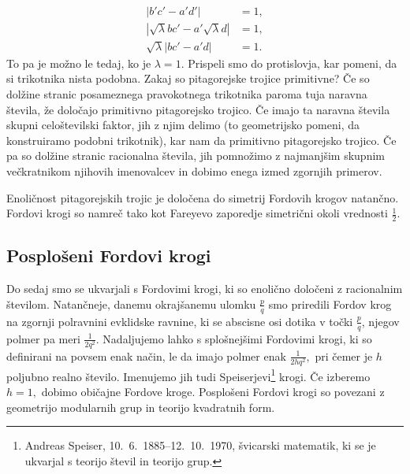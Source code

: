\documentclass[mat1]{fmfdelo}
\begin{document}
\begin{dokaz}
%
\begin{align}
|b'c'-a'd'| &= 1, \nonumber \\
|\sqrt\lambda bc' - a' \sqrt\lambda d| &= 1, \nonumber \\
\sqrt\lambda |bc'-a'd| &= 1.
\end{align}
%
To pa je možno le tedaj, ko je $\lambda=1.$ Prispeli smo do protislovja, kar pomeni, da si trikotnika nista podobna.
%
Zakaj so pitagorejske trojice primitivne?
Če so dolžine stranic posameznega pravokotnega trikotnika paroma tuja naravna števila, že določajo primitivno pitagorejsko trojico.
Če imajo ta naravna števila skupni celoštevilski faktor, jih z njim delimo (to geometrijsko pomeni, da konstruiramo podobni trikotnik), kar nam da primitivno pitagorejsko trojico.
Če pa so dolžine stranic racionalna števila, jih pomnožimo z najmanjšim skupnim večkratnikom njihovih imenovalcev in dobimo enega izmed zgornjih primerov.
\end{dokaz}

\begin{opomba}
Enoličnost pitagorejskih trojic je določena do simetrij Fordovih krogov natančno. Fordovi krogi so namreč tako kot Fareyevo zaporedje simetrični okoli vrednosti $\frac{1}{2}$.
\end{opomba}

\subsection{Posplošeni Fordovi krogi}

Do sedaj smo se ukvarjali s Fordovimi krogi, ki so enolično določeni z racionalnim številom. Natančneje, danemu okrajšanemu ulomku $\frac{p}{q}$ smo priredili Fordov krog na zgornji polravnini evklidske ravnine, ki se abscisne osi dotika v točki $\frac{p}{q}$, njegov polmer pa meri $\frac{1}{2q^2}.$
Nadaljujemo lahko s splošnejšimi Fordovimi krogi, ki so definirani na povsem enak način, le da imajo polmer enak $\frac{1}{2hq^2},$ pri čemer je $h$ poljubno realno število. Imenujemo jih tudi Speiserjevi\footnote{Andreas Speiser, 10.\ 6.\ 1885--12.\ 10.\ 1970, švicarski matematik, ki se je ukvarjal s teorijo števil in teorijo grup.} krogi. Če izberemo $h=1,$ dobimo običajne Fordove kroge.
Posplošeni Fordovi krogi so povezani z geometrijo modularnih grup in teorijo kvadratnih form.
\end{document}
